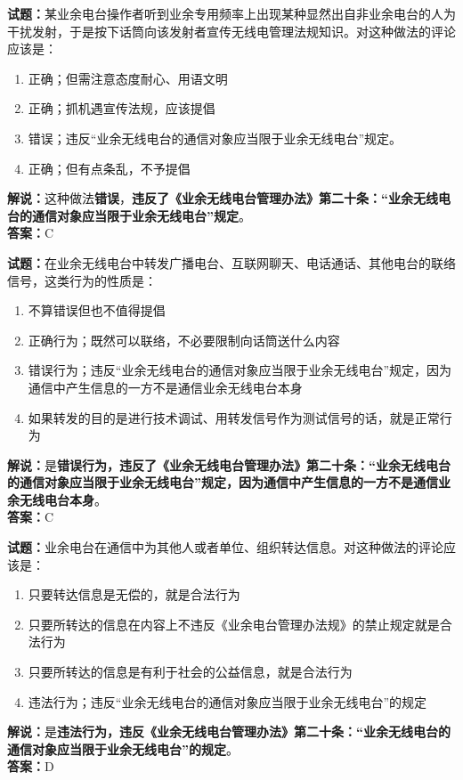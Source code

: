 \documentclass{ctexbook}
\begin{document}
\bigskip

\noindent\textbf{试题：}某业余电台操作者听到业余专用频率上出现某种显然出自非业余电台的人为干扰发射，于是按下话筒向该发射者宣传无线电管理法规知识。对这种做法的评论应该是：
\begin{enumerate}[leftmargin=3em]
  \item 正确；但需注意态度耐心、用语文明
  \item 正确；抓机遇宣传法规，应该提倡
  \item 错误；违反“业余无线电台的通信对象应当限于业余无线电台”规定。
  \item 正确；但有点条乱，不予提倡
\end{enumerate}
\noindent\textbf{解说：}这种做法\textbf{错误}，\textbf{违反了《业余无线电台管理办法》第二十条：“业余无线电台的通信对象应当限于业余无线电台”规定}。\\\noindent\textbf{答案：}C

\bigskip

\noindent\textbf{试题：}在业余无线电台中转发广播电台、互联网聊天、电话通话、其他电台的联络信号，这类行为的性质是：
\begin{enumerate}[leftmargin=3em]
  \item 不算错误但也不值得提倡
  \item 正确行为；既然可以联络，不必要限制向话筒送什么内容
  \item 错误行为；违反“业余无线电台的通信对象应当限于业余无线电台”规定，因为通信中产生信息的一方不是通信业余无线电台本身
  \item 如果转发的目的是进行技术调试、用转发信号作为测试信号的话，就是正常行为
\end{enumerate}
\noindent\textbf{解说：}是\textbf{错误行为，违反了《业余无线电台管理办法》第二十条：“业余无线电台的通信对象应当限于业余无线电台”规定，因为通信中产生信息的一方不是通信业余无线电台本身}。\\\noindent\textbf{答案：}C

\bigskip

\noindent\textbf{试题：}业余电台在通信中为其他人或者单位、组织转达信息。对这种做法的评论应该是：
\begin{enumerate}[leftmargin=3em]
  \item 只要转达信息是无偿的，就是合法行为
  \item 只要所转达的信息在内容上不违反《业余电台管理办法规》的禁止规定就是合法行为
  \item 只要所转达的信息是有利于社会的公益信息，就是合法行为
  \item 违法行为；违反“业余无线电台的通信对象应当限于业余无线电台”的规定
\end{enumerate}
\noindent\textbf{解说：}是\textbf{违法行为，违反《业余无线电台管理办法》第二十条：“业余无线电台的通信对象应当限于业余无线电台”的规定}。\\\noindent\textbf{答案：}D
\end{document}
